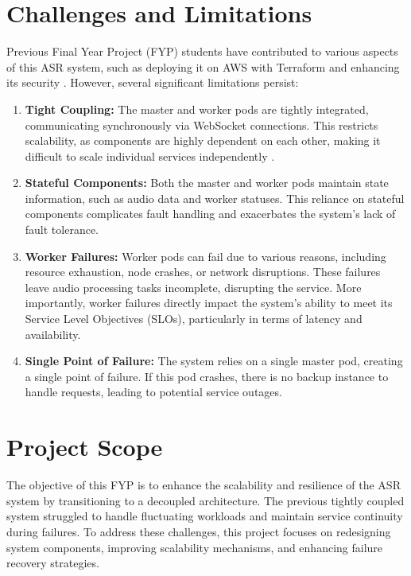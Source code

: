 \section{Challenges and Limitations}\label{section:challenges}
Previous Final Year Project (FYP) students have contributed to various aspects of this ASR system, such as deploying it on AWS with Terraform \cite{song_yu, kai_shern} and enhancing its security \cite{putra}. However, several significant limitations persist:
\begin{enumerate}
    \item \textbf{Tight Coupling:} The master and worker pods are tightly integrated, communicating synchronously via WebSocket connections. This restricts scalability, as components are highly dependent on each other, making it difficult to scale individual services independently \cite{tight_couple}.
    \item \textbf{Stateful Components:} Both the master and worker pods maintain state information, such as audio data and worker statuses. This reliance on stateful components complicates fault handling and exacerbates the system's lack of fault tolerance.
    \item \textbf{Worker Failures:} Worker pods can fail due to various reasons, including resource exhaustion, node crashes, or network disruptions. These failures leave audio processing tasks incomplete, disrupting the service. More importantly, worker failures directly impact the system's ability to meet its Service Level Objectives (SLOs), particularly in terms of latency and availability.
    \item \textbf{Single Point of Failure:} The system relies on a single master pod, creating a single point of failure. If this pod crashes, there is no backup instance to handle requests, leading to potential service outages.
    
\end{enumerate}

\section{Project Scope}
The objective of this FYP is to enhance the scalability and resilience of the ASR system by transitioning to a decoupled architecture. The previous tightly coupled system struggled to handle fluctuating workloads and maintain service continuity during failures. To address these challenges, this project focuses on redesigning system components, improving scalability mechanisms, and enhancing failure recovery strategies.

